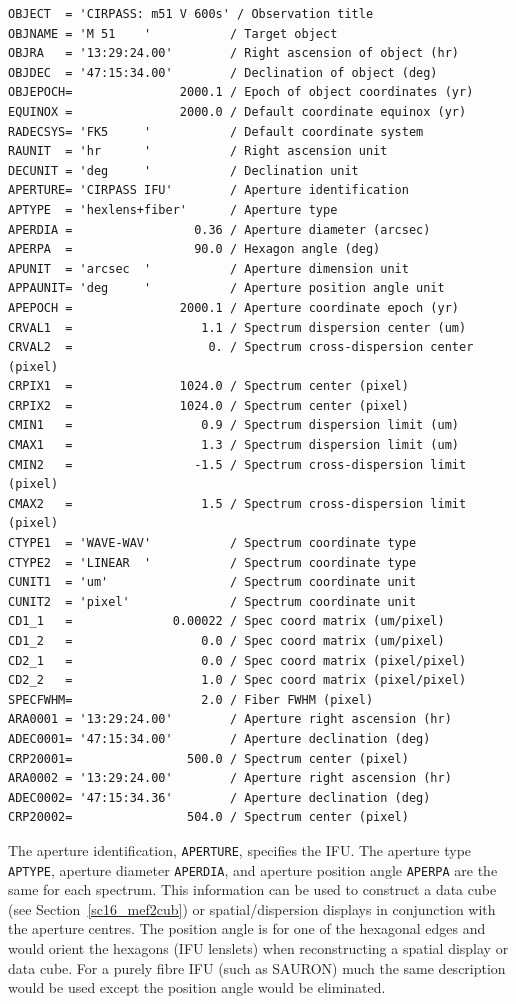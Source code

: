 \documentclass[twoside,11pt]{article}
\newcommand{\htmlref}[2]{#1}
\newcommand{\latex}[1]{#1}
\begin{document}
\small\begin{verbatim}
OBJECT  = 'CIRPASS: m51 V 600s' / Observation title
OBJNAME = 'M 51    '           / Target object
OBJRA   = '13:29:24.00'        / Right ascension of object (hr)
OBJDEC  = '47:15:34.00'        / Declination of object (deg)
OBJEPOCH=               2000.1 / Epoch of object coordinates (yr)
EQUINOX =               2000.0 / Default coordinate equinox (yr)
RADECSYS= 'FK5     '           / Default coordinate system
RAUNIT  = 'hr      '           / Right ascension unit
DECUNIT = 'deg     '           / Declination unit
APERTURE= 'CIRPASS IFU'        / Aperture identification
APTYPE  = 'hexlens+fiber'      / Aperture type
APERDIA =                 0.36 / Aperture diameter (arcsec)
APERPA  =                 90.0 / Hexagon angle (deg)
APUNIT  = 'arcsec  '           / Aperture dimension unit
APPAUNIT= 'deg     '           / Aperture position angle unit
APEPOCH =               2000.1 / Aperture coordinate epoch (yr)
CRVAL1  =                  1.1 / Spectrum dispersion center (um)
CRVAL2  =                   0. / Spectrum cross-dispersion center (pixel)
CRPIX1  =               1024.0 / Spectrum center (pixel)
CRPIX2  =               1024.0 / Spectrum center (pixel)
CMIN1   =                  0.9 / Spectrum dispersion limit (um)
CMAX1   =                  1.3 / Spectrum dispersion limit (um)
CMIN2   =                 -1.5 / Spectrum cross-dispersion limit (pixel)
CMAX2   =                  1.5 / Spectrum cross-dispersion limit (pixel)
CTYPE1  = 'WAVE-WAV'           / Spectrum coordinate type
CTYPE2  = 'LINEAR  '           / Spectrum coordinate type
CUNIT1  = 'um'                 / Spectrum coordinate unit
CUNIT2  = 'pixel'              / Spectrum coordinate unit
CD1_1   =              0.00022 / Spec coord matrix (um/pixel)
CD1_2   =                  0.0 / Spec coord matrix (um/pixel)
CD2_1   =                  0.0 / Spec coord matrix (pixel/pixel)
CD2_2   =                  1.0 / Spec coord matrix (pixel/pixel)
SPECFWHM=                  2.0 / Fiber FWHM (pixel)
ARA0001 = '13:29:24.00'        / Aperture right ascension (hr)
ADEC0001= '47:15:34.00'        / Aperture declination (deg)
CRP20001=                500.0 / Spectrum center (pixel)
ARA0002 = '13:29:24.00'        / Aperture right ascension (hr)
ADEC0002= '47:15:34.36'        / Aperture declination (deg)
CRP20002=                504.0 / Spectrum center (pixel)
\end{verbatim}\normalsize

The aperture identification, {\tt APERTURE}, specifies the IFU.  The
aperture type {\tt APTYPE}, aperture diameter {\tt APERDIA}, and
aperture position angle {\tt APERPA} are the same for each spectrum.
This information can be used to \htmlref{construct a data
cube}{sc16_mef2cub}\latex{ (see Section~\ref{sc16_mef2cub})} or
spatial/dispersion displays in conjunction with the aperture centres.
The position angle is for one of the hexagonal edges and would orient
the hexagons (IFU lenslets) when reconstructing a spatial display or
data cube.  For a purely fibre IFU (such as SAURON) much the same
description would be used except the position angle would be
eliminated.
\end{document}
